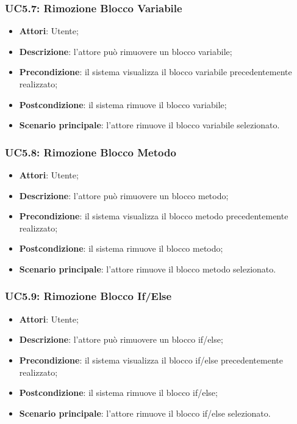 \subsubsection{UC5.7: Rimozione Blocco Variabile}
\label{UC5.7}
\begin{itemize}
	\item \textbf{Attori}: Utente;
	\item \textbf{Descrizione}: l'attore può rimuovere un blocco variabile;
	\item \textbf{Precondizione}: il sistema visualizza il blocco variabile precedentemente realizzato;
	\item \textbf{Postcondizione}: il sistema rimuove il blocco variabile;
	\item \textbf{Scenario principale}: l'attore rimuove il blocco variabile selezionato.
\end{itemize}

\subsubsection{UC5.8: Rimozione Blocco Metodo}
\label{UC5.8}
\begin{itemize}
	\item \textbf{Attori}: Utente;
	\item \textbf{Descrizione}: l'attore può rimuovere un blocco metodo;
	\item \textbf{Precondizione}: il sistema visualizza il blocco metodo precedentemente realizzato;
	\item \textbf{Postcondizione}: il sistema rimuove il blocco metodo;
	\item \textbf{Scenario principale}: l'attore rimuove il blocco metodo selezionato.
\end{itemize}

\subsubsection{UC5.9: Rimozione Blocco If/Else}
\label{UC5.9}
\begin{itemize}
	\item \textbf{Attori}: Utente;
	\item \textbf{Descrizione}: l'attore può rimuovere un blocco if/else;
	\item \textbf{Precondizione}: il sistema visualizza il blocco if/else precedentemente realizzato;
	\item \textbf{Postcondizione}: il sistema rimuove il blocco if/else;
	\item \textbf{Scenario principale}: l'attore rimuove il blocco if/else selezionato.
\end{itemize}

